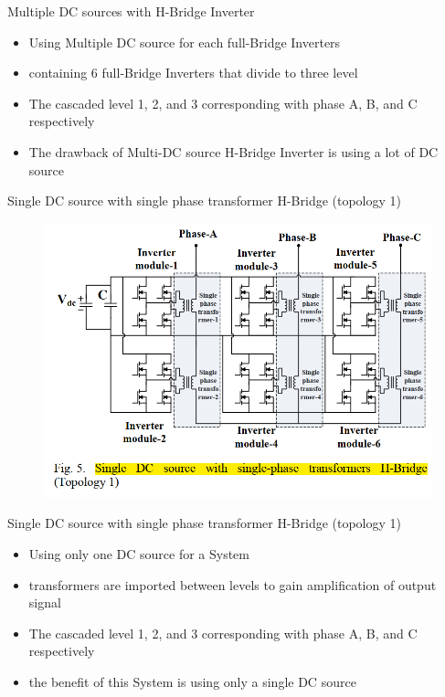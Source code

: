 \documentclass[
	11pt, %
]{beamer}
\begin{document}
\begin{frame}{Multiple DC sources with H-Bridge Inverter}
	\begin{itemize}
		\setlength{\itemsep}{10pt}
		\item {Using Multiple DC source for each full-Bridge Inverters}
		\item {containing 6 full-Bridge Inverters that divide to three level}
		\item {The cascaded level 1, 2, and 3 corresponding with phase A, B, and C respectively}
		\item {The drawback of Multi-DC source H-Bridge Inverter is using a lot of DC source}
	\end{itemize}
\end{frame}

\begin{frame}{Single DC source with single phase transformer H-Bridge (topology 1)}
	\begin{figure}
		\includegraphics[width=0.7\linewidth]{Topology1.png}
	\end{figure}
\end{frame}

\begin{frame}{Single DC source with single phase transformer H-Bridge (topology 1)}
	\begin{itemize}
		\setlength{\itemsep}{10pt}
		\item {Using only one DC source for a System}
		\item {transformers are imported between levels to gain amplification of output signal}
		\item {The cascaded level 1, 2, and 3 corresponding with phase A, B, and C respectively}
		\item {the benefit of this System is using only a single DC source}
	\end{itemize}
\end{frame}
\end{document}
